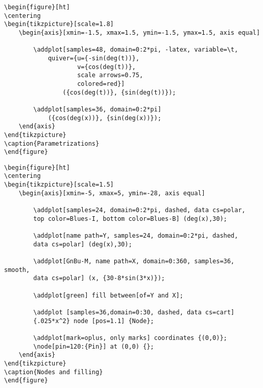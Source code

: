 




\newpage
\begin{verbatim}
\begin{figure}[ht]
\centering
\begin{tikzpicture}[scale=1.8]
    \begin{axis}[xmin=-1.5, xmax=1.5, ymin=-1.5, ymax=1.5, axis equal]
    
        \addplot[samples=48, domain=0:2*pi, -latex, variable=\t,
            quiver={u={-sin(deg(t))},
                    v={cos(deg(t))},
                    scale arrows=0.75,
                    colored=red}]
                ({cos(deg(t))}, {sin(deg(t))});
       
        \addplot[samples=36, domain=0:2*pi]
            ({cos(deg(x))}, {sin(deg(x))});
    \end{axis}
\end{tikzpicture}
\caption{Parametrizations}
\end{figure}
\end{verbatim}





\newpage
\begin{verbatim}
\begin{figure}[ht]
\centering
\begin{tikzpicture}[scale=1.5]
    \begin{axis}[xmin=-5, xmax=5, ymin=-28, axis equal]
        
        \addplot[samples=24, domain=0:2*pi, dashed, data cs=polar,
        top color=Blues-I, bottom color=Blues-B] (deg(x),30);
        
        \addplot[name path=Y, samples=24, domain=0:2*pi, dashed, 
        data cs=polar] (deg(x),30);
        
        \addplot[GnBu-M, name path=X, domain=0:360, samples=36, smooth,
        data cs=polar] (x, {30-8*sin(3*x)});
        
        \addplot[green] fill between[of=Y and X];
        
        \addplot [samples=36,domain=0:30, dashed, data cs=cart]
        {.025*x^2} node [pos=1.1] {Node};
        
        \addplot[mark=oplus, only marks] coordinates {(0,0)};
        \node[pin=120:{Pin}] at (0,0) {};
    \end{axis}
\end{tikzpicture}
\caption{Nodes and filling}
\end{figure}
\end{verbatim}

